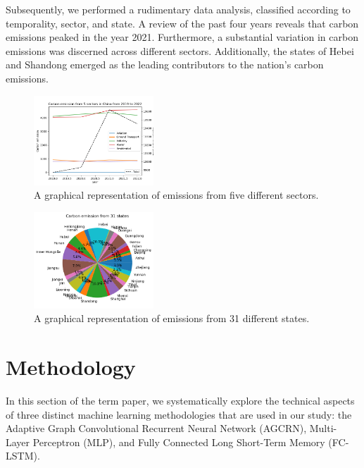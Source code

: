\documentclass[sigconf, authordraft]{acmart}
\begin{document}
	Subsequently, we performed a rudimentary data analysis, classified according
	to temporality, sector, and state. A review of the past four years reveals that
	carbon emissions peaked in the year 2021. Furthermore, a substantial variation
	in carbon emissions was discerned across different sectors. Additionally, the
	states of Hebei and Shandong emerged as the leading contributors to the nation's
	carbon emissions.

	\begin{figure}[ht]
		\centering
		\includegraphics[width=0.4\textwidth]{figures/emissions_from_5_sectors.png}
		\caption{A graphical representation of emissions from five different sectors.}
		\label{fig:emissions_from_5_sectors}
	\end{figure}

	\begin{figure}[ht]
		\centering
		\includegraphics[width=0.4\textwidth]{figures/emissions_from_31_states.png}
		\caption{A graphical representation of emissions from 31 different states.}
		\label{fig:emissions_from_31_states}
	\end{figure}

	\section{Methodology}


	In this section of the term paper, we systematically explore the technical aspects
	of three distinct machine learning methodologies that are used in our study:
	the Adaptive Graph Convolutional Recurrent Neural Network (AGCRN), Multi-Layer
	Perceptron (MLP), and Fully Connected Long Short-Term Memory (FC-LSTM).
\end{document}
